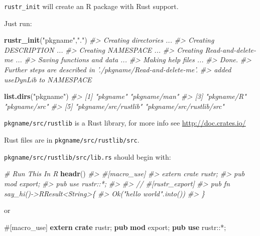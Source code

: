 \documentclass[]{book}
\newenvironment{Shaded}{\begin{snugshade}}{\end{snugshade}}
\newcommand{\KeywordTok}[1]{\textcolor[rgb]{0.13,0.29,0.53}{\textbf{{#1}}}}
\newcommand{\StringTok}[1]{\textcolor[rgb]{0.31,0.60,0.02}{{#1}}}
\newcommand{\CommentTok}[1]{\textcolor[rgb]{0.56,0.35,0.01}{\textit{{#1}}}}
\newcommand{\AttributeTok}[1]{\textcolor[rgb]{0.77,0.63,0.00}{{#1}}}
\newcommand{\NormalTok}[1]{{#1}}
\begin{document}
\texttt{rustr\_init} will create an R package with Rust support.

Just run:

\begin{Shaded}
\begin{Highlighting}[]
\KeywordTok{rustr_init}\NormalTok{(}\StringTok{"pkgname"}\NormalTok{,}\StringTok{"."}\NormalTok{)}
\CommentTok{#> Creating directories ...}
\CommentTok{#> Creating DESCRIPTION ...}
\CommentTok{#> Creating NAMESPACE ...}
\CommentTok{#> Creating Read-and-delete-me ...}
\CommentTok{#> Saving functions and data ...}
\CommentTok{#> Making help files ...}
\CommentTok{#> Done.}
\CommentTok{#> Further steps are described in './pkgname/Read-and-delete-me'.}
\CommentTok{#> added useDynLib to NAMESPACE}

\KeywordTok{list.dirs}\NormalTok{(}\StringTok{"pkgname"}\NormalTok{)}
\CommentTok{#> [1] "pkgname"                 "pkgname/man"            }
\CommentTok{#> [3] "pkgname/R"               "pkgname/src"            }
\CommentTok{#> [5] "pkgname/src/rustlib"     "pkgname/src/rustlib/src"}
\end{Highlighting}
\end{Shaded}

\texttt{pkgname/src/rustlib} is a Rust library, for more info see
\url{http://doc.crates.io/}

Rust files are in \texttt{pkgname/src/rustlib/src}.

\texttt{pkgname/src/rustlib/src/lib.rs} should begin with:

\begin{Shaded}
\begin{Highlighting}[]
\CommentTok{# Run This In R}
\KeywordTok{headr}\NormalTok{()}
\CommentTok{#> #[macro_use]}
\CommentTok{#> extern crate rustr;}
\CommentTok{#> pub mod export;}
\CommentTok{#> pub use rustr::*;}
\CommentTok{#> }
\CommentTok{#> // #[rustr_export]}
\CommentTok{#> pub fn say_hi()->RResult<String>\{}
\CommentTok{#>    Ok("hello world".into())}
\CommentTok{#> \}}
\end{Highlighting}
\end{Shaded}

or

\begin{Shaded}
\begin{Highlighting}[]
\AttributeTok{#[}\NormalTok{macro_use}\AttributeTok{]}
\KeywordTok{extern} \KeywordTok{crate} \NormalTok{rustr;}
\KeywordTok{pub} \KeywordTok{mod} \NormalTok{export;}
\KeywordTok{pub} \KeywordTok{use} \NormalTok{rustr::*;}
\end{Highlighting}
\end{Shaded}
\end{document}
